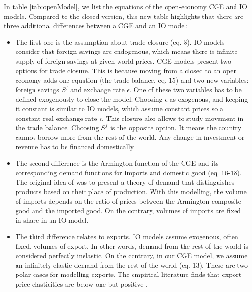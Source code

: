 In table  \ref{tab:openModel}, we list the equations of the open-economy CGE and IO models.
Compared to the closed version, this new table highlights that there are three additional differences between a CGE and an IO model: 
\begin{itemize}
	\item The first one is the assumption about trade closure (eq. 8). IO models consider that foreign savings are endogenous, which means there is infinite supply of foreign savings at given world prices. CGE models present two options for trade closure. This is because moving from a closed to an open economy adds one equation (the trade balance, eq. 15) and two new variables: foreign savings $S^f$ and exchange rate $\epsilon$. One of these two variables has to be defined exogenously to close the model. Choosing $\epsilon$ as exogenous, and keeping it constant is similar to IO models, which assume constant prices so a constant real exchange rate $\epsilon$. This closure also allows to study movement in the trade balance. Choosing $S^f$ is the opposite option. It means the country cannot borrow more from the rest of the world. Any change in investment or revenue has to be financed domestically.
	
	\item The second difference is the Armington function of the CGE and its corresponding demand functions for imports and domestic good (eq. 16-18). 
	The original idea of \citet{Armington1969} was to present a theory of demand that distinguishes products based on their place of production. 
	With this modelling, the volume of imports depends on the ratio of prices between the Armington composite good and the imported good. On the contrary, volumes of imports are fixed in share in an IO model. 
	
	\item The third difference relates to exports. IO models assume exogenous, often fixed, volumes of export. In other words, demand from the rest of the world is considered perfectly inelastic. On the contrary, in our CGE model, we assume an infinitely elastic demand from the rest of the world (eq. 13). These are two polar cases for modelling exports. The empirical literature finds that export price elasticities are below one but positive \citep{Ducoudre2014}.
\end{itemize}

